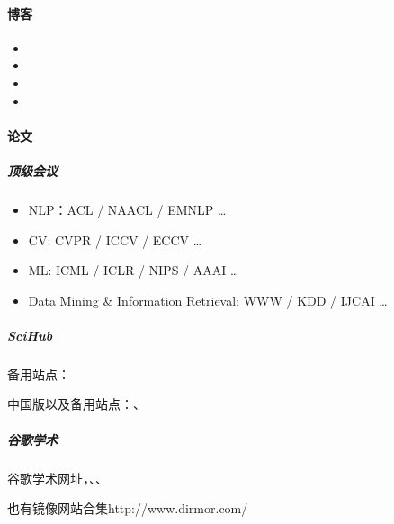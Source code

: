 \documentclass[letterpaper,11pt,english]{sphinxmanual}
\begin{document}
\paragraph{博客}
\label{\detokenize{chapter_knowledge/research:id2}}\begin{itemize}
\item {} 

\item {} 

\item {} 

\item {} 

\end{itemize}


\paragraph{论文}
\label{\detokenize{chapter_knowledge/research:id3}}

\subparagraph{顶级会议}
\label{\detokenize{chapter_knowledge/research:id4}}\begin{itemize}
\item {} 
NLP：ACL / NAACL / EMNLP …

\item {} 
CV: CVPR / ICCV / ECCV …

\item {} 
ML: ICML / ICLR / NIPS / AAAI …

\item {} 
Data Mining \& Information Retrieval: WWW / KDD / IJCAI …

\end{itemize}


\subparagraph{Sci\sphinxhyphen{}Hub}
\label{\detokenize{chapter_knowledge/research:sci-hub}}

备用站点：

中国版以及备用站点：、


\subparagraph{谷歌学术}
\label{\detokenize{chapter_knowledge/research:id5}}
谷歌学术网址，、、

也有镜像网站合集http://www.dirmor.com/
\end{document}
